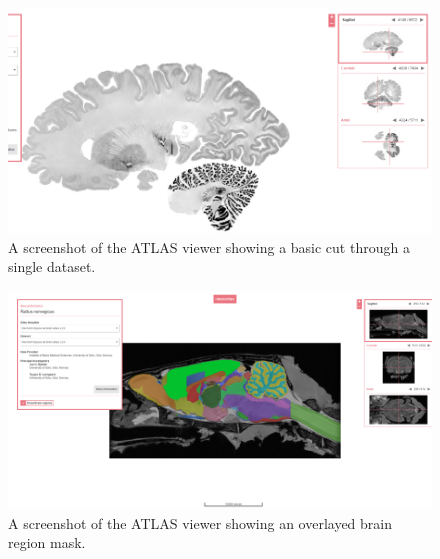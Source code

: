 \begin{figure}[h]
\centering
\includegraphics[width=\textwidth]{imgs/atlas_browse}
\caption{A screenshot of the ATLAS viewer showing a basic cut through a single dataset. }
\label{fig:atlas_browser}
\end{figure}

\begin{figure}[h]
\centering
\includegraphics[width=\textwidth]{imgs/atlas_masks}
\caption{A screenshot of the ATLAS viewer showing an overlayed brain region mask. }
\label{fig:atlas_masks}
\end{figure}
